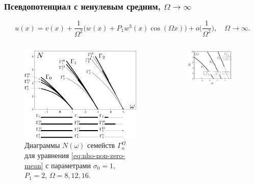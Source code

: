 \documentclass [10pt] {beamer}
\begin{document}
\begin{frame}
	\frametitle{Псевдопотенциал с ненулевым средним, $\Omega \to \infty$}
	
	\begin{equation}
		u(x) = v(x) + \frac{1}{\Omega^2} \bigg( w(x) + P_1 w^3(x) \cos (\Omega x) \bigg) + o \bigg( \frac{1}{\Omega^2} \bigg), \quad \Omega \to \infty.
	\end{equation}
	
	\begin{columns}[T]
		\begin{column}{.5\textwidth}
			\begin{figure}[h]
			\includegraphics[width = 1\textwidth]{pic/branches with linear counterpart, non-zero mean cosine nho}
			\caption{
			Диаграммы $N(\omega)$ семейств $\Gamma_n^{\Omega}$ для уравнения \eqref{eq:nho-non-zero-mean} с параметрами $\sigma_0 = 1$, $P_1 = 2$, $\Omega = 8, 12, 16$.
			}
			\end{figure}
		\end{column}
		\begin{column}{.5\textwidth}
			\begin{figure}[h]
			\includegraphics[width = 0.82\textwidth]{pic/stability for nho with constant pseudopotential, left}

\end{figure}
\end{column}
\end{columns}
\end{frame}
\end{document}
